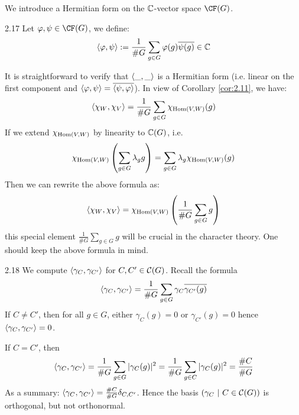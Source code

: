 \documentclass[twoside = false,	%
		headsepline,		%
		parskip = true,
		]{scrbook}						%
\begin{document}
    We introduce a Hermitian form on the $\mathbb C$-vector space $\CF(G)$.
    \begin{definition}{}{2.17}
        Let $\varphi,\psi \in \CF(G)$, we define:
        \begin{equation*}
            \left\langle \varphi,\psi\right\rangle := \frac{1}{\#G} \sum_{g \in G} \varphi(g) \overline{\psi(g)} \in \mathbb C
        \end{equation*}
    \end{definition}
    It is straightforward to verify that $\left\langle \_,\_\right\rangle$ is a Hermitian form (i.e. linear on the first component and $\left\langle \varphi,\psi\right\rangle = \overline{\left\langle \psi,\varphi\right\rangle}$).
    In view of Corollary \ref{cor:2.11}, we have:
    \begin{equation*}
        \left\langle \chi_W,\chi_V\right\rangle = \frac{1}{\#G} \sum_{g \in G} \chi_{\mathrm{Hom}(V,W)}(g)
    \end{equation*}
    If we extend $\chi_{\mathrm{Hom}(V,W)}$ by linearity to $\mathbb C(G)$, i.e.
    \begin{equation*}
        \chi_{\mathrm{Hom}(V,W)}\left( \sum_{g \in G} \lambda_g g\right) = \sum_{g \in G} \lambda_g \chi_{\mathrm{Hom}(V,W)}(g)
    \end{equation*}
    Then we can rewrite the above formula as:
    \begin{equation*}
        \left\langle \chi_W,\chi_V\right\rangle = \chi_{\mathrm{Hom}(V,W)} \left( \frac{1}{\#G} \sum_{g \in G}g\right)
    \end{equation*}
    this special element $\frac{1}{\#G} \sum\limits_{g \in G}g$ will be crucial in the character theory. One should keep the above formula in mind.
    \begin{example}{}{2.18}
        We compute $\left\langle \gamma_C,\gamma_{C'}\right\rangle$ for $C,C' \in \mathcal C(G)$.
        Recall the formula
        \begin{equation*}
            \left\langle \gamma_C,\gamma_{C'}\right\rangle = \frac{1}{\#G} \sum_{g \in G}\gamma_C \overline{\gamma_{C'}(g)}
        \end{equation*}
        If $C \neq C'$, then for all $g \in G$, either $\gamma_C(g) = 0$ or $\gamma_{C'}(g) = 0$ hence $\left\langle \gamma_C,\gamma_{C'}\right\rangle = 0$.
        
        If $C = C'$, then
        \begin{equation*}
            \left\langle \gamma_C,\gamma_{C'}\right\rangle = \frac{1}{\#G}\sum_{g \in G} |\gamma_C(g)|^2 = \frac{1}{\#G} \sum_{g \in C} |\gamma_C(g)|^2 = \frac{\#C}{\#G}
        \end{equation*}
        As a summary: $\left\langle \gamma_C,\gamma_{C'}\right\rangle = \frac{\#C}{\#G} \delta_{C,C'}$. Hence the basis $(\gamma_C \ | \ C \in \mathcal C(G)) $ is orthogonal, but not orthonormal.
    \end{example}
\end{document}
